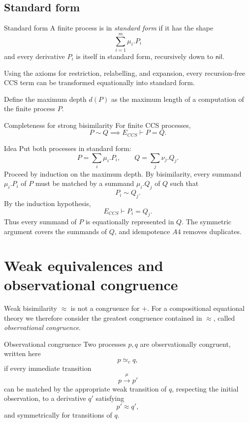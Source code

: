 \documentclass[a4paper]{article}
\newcommand{\nil}{\mathsf{nil}}
\newcommand{\trans}[1]{\xrightarrow{#1}}
\begin{document}
\subsection{Standard form}

\begin{snippetdefinition}{Standard form}
    A finite process is in \emph{standard form} if it has the shape
    \[
        \sum_{i=1}^m\mu_i.P_i
    \]
    and every derivative \(P_i\) is itself in standard form, recursively down to \(\nil\).
\end{snippetdefinition}

Using the axioms for restriction, relabelling, and expansion, every recursion-free CCS term can be transformed equationally into standard form.

Define the maximum depth \(d(P)\) as the maximum length of a computation of the finite process \(P\).

\begin{snippettheorem}{Completeness for strong bisimilarity}
    For finite CCS processes,
    \[
        P\sim Q
        \implies
        E_{CCS}\vdash P=Q.
    \]
\end{snippettheorem}

\begin{snippetproof}{Idea}
    Put both processes in standard form:
    \[
        P=\sum_i\mu_i.P_i,
        \qquad
        Q=\sum_j\nu_j.Q_j.
    \]
    Proceed by induction on the maximum depth.
    By bisimilarity, every summand \(\mu_i.P_i\) of \(P\) must be matched by a summand \(\mu_i.Q_j\) of \(Q\) such that
    \[
        P_i\sim Q_j.
    \]
    By the induction hypothesis,
    \[
        E_{CCS}\vdash P_i=Q_j.
    \]
    Thus every summand of \(P\) is equationally represented in \(Q\).
    The symmetric argument covers the summands of \(Q\), and idempotence \(A4\) removes duplicates.
\end{snippetproof}

\section{Weak equivalences and observational congruence}

Weak bisimilarity \(\approx\) is not a congruence for \(+\).
For a compositional equational theory we therefore consider the greatest congruence contained in \(\approx\), called \emph{observational congruence}.

\begin{snippetdefinition}{Observational congruence}
    Two processes \(p,q\) are observationally congruent, written here
    \[
        p\simeq_c q,
    \]
    if every immediate transition
    \[
        p\trans{\mu}p'
    \]
    can be matched by the appropriate weak transition of \(q\), respecting the initial observation, to a derivative \(q'\) satisfying
    \[
        p'\approx q',
    \]
    and symmetrically for transitions of \(q\).
\end{snippetdefinition}
\end{document}
